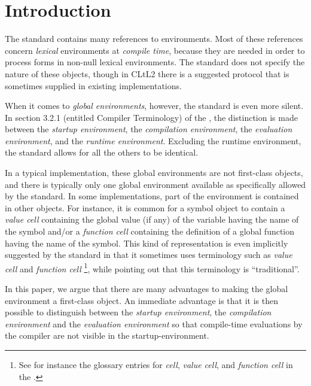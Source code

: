 \section{Introduction}

The \commonlisp{} standard contains many references to environments.
Most of these references concern \emph{lexical} environments at
\emph{compile time}, because they are needed in order to process forms
in non-null lexical environments.  The standard does not specify the
nature of these objects, though in CLtL2 \cite{Steele:1990:CLL:95411}
there is a suggested protocol that is sometimes supplied in existing
\commonlisp{} implementations. 

When it comes to \emph{global environments}, however, the standard is
even more silent.  In section 3.2.1 (entitled Compiler Terminology) of
the \commonlisp{} \hs{}, the distinction is made between the
\emph{startup environment}, the \emph{compilation environment}, the
\emph{evaluation environment}, and the \emph{runtime environment}.
Excluding the runtime environment, the standard allows for all the
others to be identical.

In a typical \commonlisp{} implementation, these global environments
are not first-class objects, and there is typically only one global
environment available as specifically allowed by the standard.  In some
implementations, part of the environment is contained in other
objects.  For instance, it is common for a symbol object to contain a
\emph{value cell} containing the global value (if any) of the variable
having the name of the symbol and/or a \emph{function cell} containing
the definition of a global function having the name of the symbol.
This kind of representation is even implicitly suggested by the
standard in that it sometimes uses terminology such as \emph{value
  cell} and \emph{function cell}%
\footnote{See for instance the glossary entries for \emph{cell},
  \emph{value cell}, and \emph{function cell} in the
  \hs{}.},  while pointing out that this terminology is ``traditional''.

In this paper, we argue that there are many advantages to making the
global environment a first-class object.  An immediate advantage is
that it is then possible to distinguish between the \emph{startup
  environment}, the \emph{compilation environment} and the
\emph{evaluation environment} so that compile-time evaluations by the
compiler are not visible in the startup-environment.

